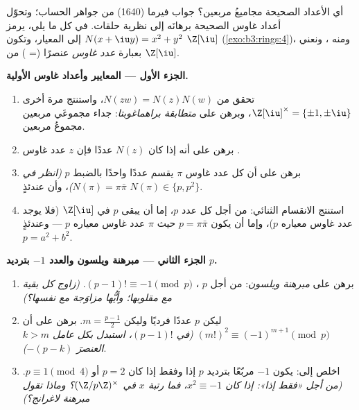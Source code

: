 \begin{problem}\label{pb:b3:rings:1}
أي الأعداد الصحيحة مجاميعُ مربعين؟ جواب فيرما (1640) من جواهر
الحساب؛ وتحوّل أعداد غاوس الصحيحة برهانَه إلى نظرية حلقات. في كل
ما يلي، يرمز $N(x + \iu y) = x^2 + y^2$ إلى المعيار، وتكون $\Z[\iu]$ 
(\cref{exo:b3:rings:4})، ومنه  ، ونعني
بعبارة \emph{عدد غاوس } عنصرًا  (= )
من $\Z[\iu]$.

\medskip
\noindent\textbf{الجزء الأول --- المعايير وأعداد غاوس الأولية.}
\begin{enumerate}
  \item تحقق من $N(zw) = N(z)N(w)$، واستنتج مرة أخرى $\Z[\iu]^\times =
        \{\pm1, \pm\iu\}$، وبرهن على
        \emph{متطابقة براهماغوبتا}: جداء مجموعَي مربعين مجموعُ
        مربعين.
  \item برهن على أنه إذا كان $N(z)$ عددًا  فإن $z$ عدد
        غاوس .
  \item برهن على أن كل عدد غاوس  $\pi$ يقسم عددًا 
        واحدًا بالضبط $p$ \emph{(انظر في $N(\pi) = \pi\bar\pi$)}، وأن عندئذٍ
        $N(\pi) \in \{p, p^2\}$.
  \item استنتج الانقسام الثنائي: من أجل كل عدد  $p$، إما أن
        يبقى $p$  في $\Z[\iu]$ (فلا يوجد عدد غاوس 
        معياره $p$)، وإما أن يكون $p = \pi\bar\pi$ حيث $\pi$ عدد
        غاوس  معياره $p$ --- وعندئذٍ $p = a^2 + b^2$.
\end{enumerate}

\medskip
\noindent\textbf{الجزء الثاني --- مبرهنة ويلسون والعدد $-1$
بترديد $p$.}
\begin{enumerate}[resume]
  \item برهن على \emph{مبرهنة ويلسون}: من أجل $p$ ، $(p-1)!
        \equiv -1 \pmod p$.
        \emph{(زاوج كل بقية مع مقلوبها؛ وأيُّها مزاوَجة مع
        نفسها؟)}
  \item ليكن $p$ عددًا  فرديًا وليكن $m = \frac{p-1}2$. برهن على أن
        $(m!)^2 \equiv (-1)^{m+1} \pmod p$ \emph{(في $(p-1)!$، استبدل بكل عامل $k > m$
        العنصرَ $-(p - k)$)}.
  \item اخلص إلى: يكون $-1$ مربّعًا بترديد $p$ إذا وفقط إذا كان
        $p = 2$ أو $p
        \equiv 1 \pmod 4$. \emph{(من أجل «فقط إذا»: إذا كان
        $x^2
        \equiv -1$، فما رتبة $x$ في $(\Z/p\Z)^\times$؟ وماذا تقول مبرهنة
        لاغرانج؟)}
\end{enumerate}


\end{problem}
